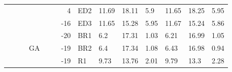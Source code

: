 {\begin{minipage}{\linewidth}
\begin{tabular}{l|l|l|l|c|c|r|l|lll|lll}
                                              &                                          &                                           &                                           & \multicolumn{1}{l|}{}                      &                                                                                         & 4                                                                                              & ED2                                       & 11.69 & 18.11 & 5.9       & 11.65 & 18.25 & 5.95       \\
                                              &                                          &                                           &                                           & \multicolumn{1}{l|}{}                      &                                                                                         & -16                                                                                            & ED3                                       & 11.65 & 15.28 & 5.95      & 11.67 & 15.24 & 5.86       \\
  \cline{4-4}\cline{7-14}
                                              &                                          &                                           & \multirow{8}{*}{GA}                       & \multicolumn{1}{l|}{}                      &                                                                                         & -20                                                                                            & BR1                                       & 6.2   & 17.31 & 1.03      & 6.21  & 16.99 & 1.05       \\
                                              &                                          &                                           &                                           & \multicolumn{1}{l|}{}                      &                                                                                         & -19                                                                                            & BR2                                       & 6.4   & 17.34 & 1.08      & 6.43  & 16.98 & 0.94       \\
                                              &                                          &                                           &                                           & \multicolumn{1}{l|}{}                      &                                                                                         & -19                                                                                            & R1                                        & 9.73  & 13.76 & 2.01      & 9.79  & 13.3  & 2.28       \\

\end{tabular}
\end{minipage}}

